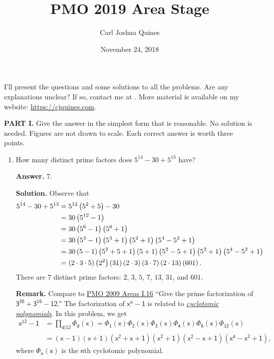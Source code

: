 \documentclass[11pt,paper=letter]{scrartcl}
\begin{document}
\title{PMO 2019 Area Stage}
\author{Carl Joshua Quines}
\date{November 24, 2018}

\maketitle

I'll present the questions and some solutions to all the problems. Are any explanations unclear? If so, contact me at . More material is available on my website: \url{https://cjquines.com}.

\textbf{PART I.} Give the answer in the simplest form that is reasonable. No solution is needed. Figures are not drawn to scale. Each correct answer is worth three points.

\begin{enumerate}[left=0pt]

\item How many distinct prime factors does $5^{14} - 30 + 5^{13}$ have?

{\sffamily \bfseries Answer.} $\boxed{7}$.

{\sffamily \bfseries Solution.} Observe that
\begin{align*}
  5^{14} - 30 + 5^{13} &= 5^{12}\left( 5^2 + 5 \right) - 30 \\
  &= 30\left( 5^{12} - 1 \right) \\
  &= 30\left( 5^6 - 1 \right)\left( 5^6 + 1 \right) \\
  &= 30\left( 5^3 - 1 \right)\left( 5^3 + 1 \right)\left( 5^2 + 1 \right)\left( 5^4 - 5^2 + 1 \right) \\
  &= 30\left( 5 - 1 \right)\left( 5^2 + 5 + 1 \right)\left( 5 + 1 \right)\left( 5^2 - 5 + 1 \right)\left( 5^2 + 1 \right)\left( 5^4 - 5^2 + 1 \right) \\
  &= \left( 2 \cdot 3 \cdot 5 \right)\left( 2^2 \right)\left( 31 \right)\left( 2 \cdot 3 \right)\left( 3 \cdot 7 \right)\left( 2 \cdot 13 \right)\left( 601 \right).
\end{align*}
There are $7$ distinct prime factors: $2$, $3$, $5$, $7$, $13$, $31$, and $601$.

{\small \sffamily \textbf{Remark.} Compare to \href{http://cjquines.com/files/pmo2009.pdf}{PMO 2009 Areas I.16} ``Give the prime factorization of $\mathsf{3^{20} + 3^{19} - 12}$.'' The factorization of $\mathsf{x^n - 1}$ is related to \href{https://en.wikipedia.org/wiki/Cyclotomic_polynomial}{\emph{cyclotomic polynomials}}. In this problem, we get \begin{align*}\mathsf{x^{12} - 1} &= \mathsf{\prod_{d|12}\Phi_d(x) = \Phi_1(x)\Phi_2(x)\Phi_3(x)\Phi_4(x)\Phi_6(x)\Phi_{12}(x)} \\ &= \mathsf{(x-1)(x+1)(x^2+x+1)(x^2+1)(x^2-x+1)(x^4-x^2+1)},\end{align*} where $\mathsf{\Phi_n(x)}$ is the $\mathsf{n}$th cyclotomic polynomial.}


\end{enumerate}
\end{document}
